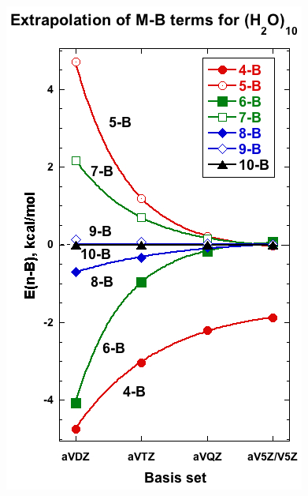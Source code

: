 \documentclass [11pt, proquest] {uwthesis}[2020/02/24]
\begin{document}
\begin{figure}[t]
\uwsinglespace
\begin{center}
\begin{minipage}{0.45\textwidth}
\includegraphics[width=.9\textwidth]{Figures/Chapter_2/MB_extrap_w10_noBSSE.jpg}
\end{minipage}
\begin{minipage}{0.45\textwidth}

\end{minipage}
\end{center}
\end{figure}
\end{document}
